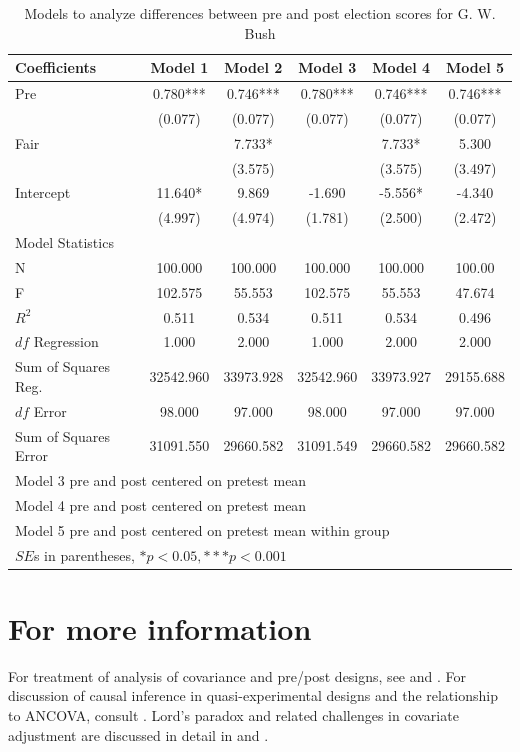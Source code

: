 \begin{table}[htbp]\centering
 \caption{Models to analyze differences between pre and post election scores for G. W. Bush
\label{tab:bushreg}}
\begin{tabular}{lccccc}
\hline
Coefficients & Model 1 & Model 2 & Model 3 & Model 4 & Model 5 \\
\hline
Pre  &    0.780***&    0.746***&    0.780***&    0.746*** & 0.746*** \\
      &   (0.077)  &   (0.077)  &   (0.077)  &   (0.077) & (0.077) \\
Fair    &        &    7.733* &        &    7.733* & 5.300 \\
      &        &   (3.575)  &        &   (3.575) & (3.497)  \\
Intercept    &   11.640* &    9.869  &   -1.690  &   -5.556* & -4.340 \\
      &   (4.997)  &   (4.974)  &   (1.781)  &   (2.500) & (2.472) \\
\hline
\multicolumn{6}{l}{Model Statistics} \\
\hline
N      &   100.000  &   100.000  &   100.000  &   100.000 & 100.00 \\
F      &   102.575  &   55.553  &   102.575  &   55.553 & 47.674  \\
$R^2$     &    0.511  &    0.534  &    0.511  &    0.534 & 0.496 \\
$df$ Regression    &    1.000  &    2.000  &    1.000  &    2.000 & 2.000 \\
Sum of Squares Reg.    &  32542.960  &  33973.928  &  32542.960  &  33973.927 & 29155.688  \\
$df$ Error    &   98.000  &   97.000  &   98.000  &   97.000 & 97.000  \\
Sum of Squares Error     &  31091.550  &  29660.582  &  31091.549  &  29660.582 & 29660.582  \\
\hline
\multicolumn{5}{l}{Model 3 pre and post centered on pretest mean } \\
\multicolumn{5}{l}{Model 4 pre and post centered on pretest mean } \\
\multicolumn{5}{l}{Model 5 pre and post centered on pretest mean within group} \\
\multicolumn{5}{l}{$SE$s in parentheses, $*p<0.05, ***p<0.001$} \\
\hline
\end{tabular}
\end{table}

\section*{For more information}
For treatment of analysis of covariance and pre/post designs, see \citep{agresti} and \citep{cameron2005microeconometrics}. For discussion of causal inference in quasi-experimental designs and the relationship to ANCOVA, consult \citep{qed}. Lord's paradox and related challenges in covariate adjustment are discussed in detail in \citep{lord67} and \citep{lord69}.
